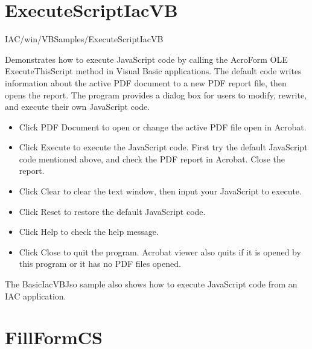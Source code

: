 \documentclass[letterpaper,12pt,english,openany,oneside]{sphinxmanual}
\begin{document}
\section{ExecuteScriptIacVB}
\label{\detokenize{Samples_WindowsIAC:executescriptiacvb}}\label{\detokenize{Samples_WindowsIAC:location-14}}

IAC/win/VBSamples/ExecuteScriptIacVB

\label{\detokenize{Samples_WindowsIAC:description-14}}

Demonstrates how to execute JavaScript code by calling the AcroForm OLE ExecuteThisScript method in Visual Basic applications. The default code writes information about the active PDF document to a new PDF report file, then opens the report. The program provides a dialog box for users to modify, rewrite, and execute their own JavaScript code.

\label{\detokenize{Samples_WindowsIAC:usage-10}}
\begin{itemize}
\item {} 
Click PDF Document to open or change the active PDF file open in Acrobat.

\item {} 
Click Execute to execute the JavaScript code. First try the default JavaScript code mentioned above, and check the PDF report in Acrobat. Close the report.

\item {} 
Click Clear to clear the text window, then input your JavaScript to execute.

\item {} 
Click Reset to restore the default JavaScript code.

\item {} 
Click Help to check the help message.

\item {} 
Click Close to quit the program. Acrobat viewer also quits if it is opened by this program or it has no PDF files opened.

\end{itemize}

The BasicIacVBJso sample also shows how to execute JavaScript code from an IAC application.


\section{FillFormCS}
\label{\detokenize{Samples_WindowsIAC:fillformcs}}\label{\detokenize{Samples_WindowsIAC:location-15}}
\end{document}

